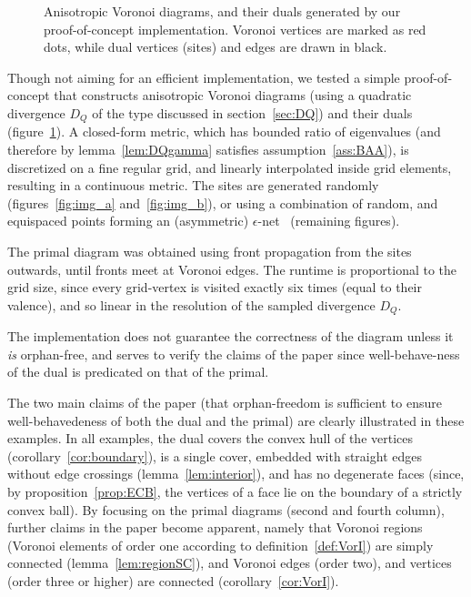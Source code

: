 \documentclass[11pt]{article}
\begin{document}
\begin{figure}[ht]
\centering
{}
\quad
{}
\caption{
Anisotropic Voronoi diagrams, and their duals generated by our
proof-of-concept implementation. 
Voronoi vertices are marked as red dots, while dual vertices (sites) and edges are drawn
in black.}
\label{fig:test}
\end{figure}



Though not aiming for an efficient implementation, 
we tested a simple proof-of-concept that constructs anisotropic Voronoi diagrams
(using a quadratic divergence $D_Q$ of the type discussed in section~\ref{sec:DQ}) 
and their duals
(figure~\ref{fig:test}). 
A closed-form metric, which has bounded ratio of eigenvalues 
(and therefore by lemma~\ref{lem:DQgamma} satisfies assumption~\ref{ass:BAA}), 
is discretized on a fine regular grid, and linearly interpolated inside grid elements, resulting in a
continuous metric. The sites are generated randomly (figures~\ref{fig:img_a}
and~\ref{fig:img_b}), or using a combination of random, and equispaced
points forming an (asymmetric) $\epsilon$-net~\cite{avd} (remaining figures). 

The primal diagram was obtained using front propagation from the sites
outwards, until fronts meet at Voronoi edges. 
The runtime is proportional to the grid size, since every grid-vertex is visited exactly six times (equal to their valence), 
	and so linear in the resolution of the sampled divergence $D_Q$. 

The implementation does not guarantee the correctness of the diagram unless it \emph{is} orphan-free, and serves to verify the claims of the paper since well-behave-ness of the dual is predicated on that of the primal. 

The two main claims of the paper (that orphan-freedom is sufficient to ensure well-behavedeness of 
both the dual and the primal) are clearly illustrated in these examples. 
In all examples, the dual covers the convex hull of the vertices
(corollary~\ref{cor:boundary}), is a
single cover, embedded with straight edges without edge crossings
(lemma~\ref{lem:interior}), 
and has no degenerate faces 
(since, by proposition~\ref{prop:ECB}, the vertices of a face lie on the boundary of a strictly convex ball). 
By focusing on the primal diagrams (second and fourth column), further claims in
the paper become apparent, namely that Voronoi regions 
(Voronoi elements of order one according to definition~\ref{def:VorI}) are simply connected (lemma~\ref{lem:regionSC}), 
and Voronoi edges (order two), and vertices (order three or higher) are connected (corollary~\ref{cor:VorI}). 
\end{document}

